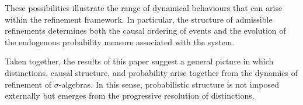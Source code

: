 \documentclass[
 amsmath,amssymb,
  onecolumn %
]{revtex4-2}
\begin{document}
These possibilities illustrate the range of dynamical behaviours that
can arise within the refinement framework. In particular, the
structure of admissible refinements determines both the causal
ordering of events and the evolution of the endogenous probability
measure associated with the system.

Taken together, the results of this paper suggest a general picture in
which distinctions, causal structure, and probability arise together
from the dynamics of refinement of $\sigma$-algebras. In this sense, probabilistic structure is not imposed externally but emerges from the progressive resolution of distinctions.







\end{document}
